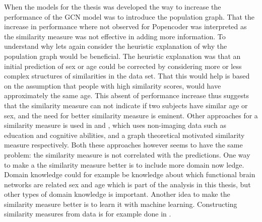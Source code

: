 When the models for the thesis was developed the way to increase the performance of the GCN model was to introduce the population graph. That the increase in performance where not observed for Popencoder was interpreted as the similarity measure was not effective in adding more information. To understand why lets again consider the heuristic explanation of why the population graph would be beneficial. The heuristic explanation was that an initial prediction of sex or age could be corrected by considering more or less complex structures of similarities in the data set. That this would help is based on the assumption that people with high similarity scores, would have approximately the same age. This absent of performance increase thus suggests that the similarity measure can not indicate if two subjects have similar age or sex, and the need for better similarity measure is eminent. Other approaches for a similarity measure is used in \cite{stankeviciute} and \cite{higcn}, which uses non-imaging data such as education and cognitive abilities, and a graph theoretical motivated similarity measure respectively. Both these approaches however seems to have the same problem: the similarity measure is not correlated with the predictions. One way to make a the similarity measure better is to include more domain now ledge. Domain knowledge could for example be knowledge about which functional brain networks are related sex and age which is part of the analysis in this thesis, but other types of domain knowledge is important. Another idea to make the similarity measure better is to learn it with machine learning. Constructing similarity measures from data is for example done in \cite{}.





